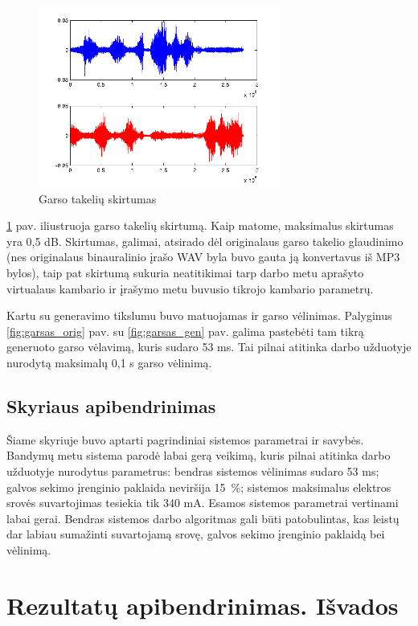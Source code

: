 \documentclass[]{vgtuef}
\begin{document}
\begin{figure}[htbp]
  \centering
  \includegraphics[width=300px]{img/garso_skirtumas.png}
  \caption{Garso takelių skirtumas}
  \label{fig:garsas_diff}
\end{figure}

\ref{fig:garsas_diff} pav. iliustruoja garso takelių skirtumą. Kaip matome, maksimalus skirtumas yra 0,5 dB. Skirtumas, galimai, atsirado dėl originalaus garso takelio glaudinimo (nes originalaus binauralinio įrašo WAV byla buvo gauta ją konvertavus iš MP3 bylos), taip pat skirtumą sukuria neatitikimai tarp darbo metu aprašyto virtualaus kambario ir įrašymo metu buvusio tikrojo kambario parametrų. 

Kartu su generavimo tikslumu buvo matuojamas ir garso vėlinimas. Palyginus \ref{fig:garsas_orig} pav. su \ref{fig:garsas_gen} pav. galima pastebėti tam tikrą generuoto garso vėlavimą, kuris sudaro 53 ms. Tai pilnai atitinka darbo užduotyje nurodytą maksimalų 0,1 s garso vėlinimą.

\subsection{Skyriaus apibendrinimas}

Šiame skyriuje buvo aptarti pagrindiniai sistemos parametrai ir savybės. Bandymų metu sistema parodė labai gerą veikimą, kuris pilnai atitinka darbo užduotyje nurodytus parametrus: bendras sistemos vėlinimas sudaro 53 ms; galvos sekimo įrenginio paklaida neviršija 15~\%; sistemos maksimalus elektros srovės suvartojimas tesiekia tik 340 mA. Esamos sistemos parametrai vertinami labai gerai. Bendras sistemos darbo algoritmas gali būti patobulintas, kas leistų dar labiau sumažinti suvartojamą srovę, galvos sekimo įrenginio paklaidą bei vėlinimą.

\section{Rezultatų apibendrinimas. Išvados}
\end{document}
